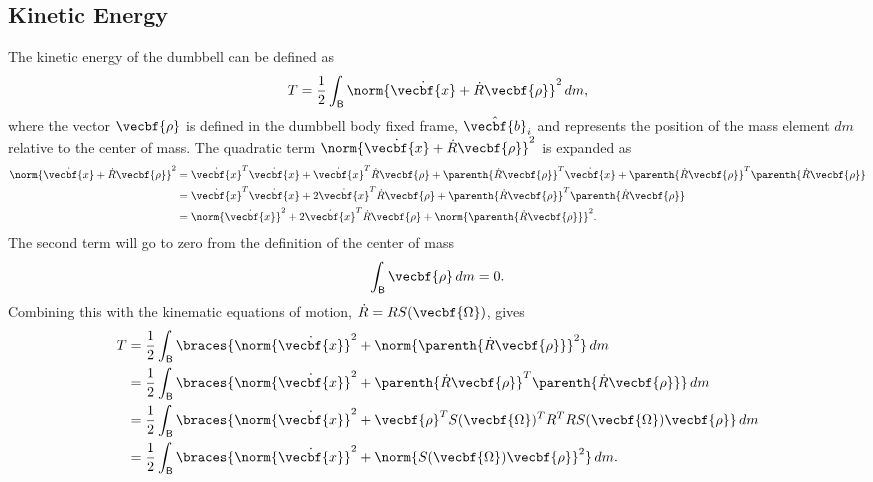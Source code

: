 \documentclass[11pt, reqno]{article}    %
\begin{document}
\subsection{Kinetic Energy}
The kinetic energy of the dumbbell can be defined as
\begin{align}
    T = \frac{1}{2} \int_{\mathsf{B}} \norm{\dot{\vecbf{x}} + \dot{R} \vecbf{\rho} }^2 \, dm ,
\end{align}
where the vector \( \vecbf{\rho} \) is defined in the dumbbell body fixed frame, \( \hat{\vecbf{b}}_i \) and represents the position of the mass element \( dm \) relative to the center of mass.
The quadratic term \( \norm{\dot{\vecbf{x}} + \dot{R} \vecbf{\rho} }^2 \) is expanded as
\begin{align}
    \norm{\dot{\vecbf{x}} + \dot{R} \vecbf{\rho} }^2 &= \dot{\vecbf{x}}^T \dot{\vecbf{x}} + \dot{\vecbf{x}}^T \dot{R} \vecbf{\rho} + \parenth{ \dot{R} \vecbf{\rho}}^T \dot{\vecbf{x}} + \parenth{\dot{R} \vecbf{\rho}}^T \parenth{\dot{R} \vecbf{\rho}} \nonumber\\
    &= \dot{\vecbf{x}}^T \dot{\vecbf{x}} + 2 \dot{\vecbf{x}}^T \dot{R} \vecbf{\rho} + \parenth{\dot{R} \vecbf{\rho}}^T \parenth{\dot{R} \vecbf{\rho}} \nonumber\\
    &= \norm{\dot{\vecbf{x}}}^2 + 2 \dot{\vecbf{x}}^T \dot{R} \vecbf{\rho} + \norm{\parenth{\dot{R} \vecbf{\rho}} }^2 .
\end{align}
The second term will go to zero from the definition of the center of mass
\begin{align}
    \int_{\mathsf{B}} \vecbf{\rho} \, dm = 0 .
\end{align}
Combining this with the kinematic equations of motion, \( \dot{R} = R S(\vecbf{\Omega}) \), gives
\begin{align}
    T &= \frac{1}{2} \int_{\mathsf{B}} \braces{ \norm{\dot{\vecbf{x}}}^2 + \norm{\parenth{\dot{R} \vecbf{\rho}} }^2  } \, dm \nonumber\\
    &= \frac{1}{2} \int_{\mathsf{B}} \braces{ \norm{\dot{\vecbf{x}}}^2 + \parenth{\dot{R} \vecbf{\rho}}^T \parenth{\dot{R} \vecbf{\rho}}  } \, dm \nonumber\\
    &= \frac{1}{2} \int_{\mathsf{B}} \braces{ \norm{\dot{\vecbf{x}}}^2 + \vecbf{\rho}^T S(\vecbf{\Omega})^T R^T R S(\vecbf{\Omega}) \vecbf{\rho}  } \, dm \nonumber\\
    &= \frac{1}{2} \int_{\mathsf{B}} \braces{ \norm{\dot{\vecbf{x}}}^2 + \norm{S(\vecbf{\Omega}) \vecbf{\rho}}^2  } \, dm  .
\end{align}
\end{document}
